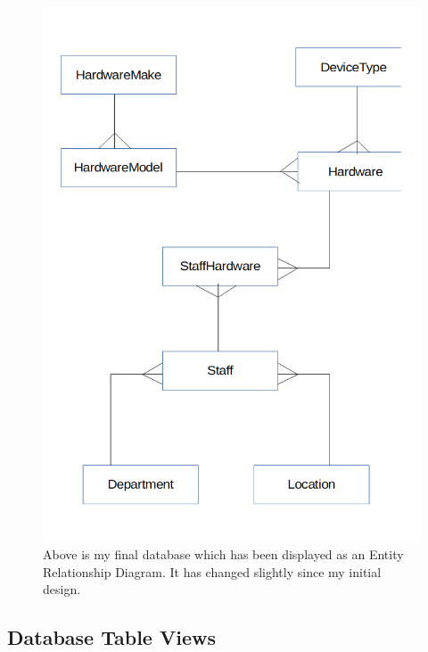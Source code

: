 \begin{figure}[H]
    \includegraphics[width=\textwidth]{./Maintenance/Images/erupdateddiagram.png}
    \caption{Above is my final database which has been displayed as an Entity Relationship Diagram. It has changed slightly since my initial design.} \label{fig:erdiagram}
\end{figure}

\subsection{Database Table Views}

